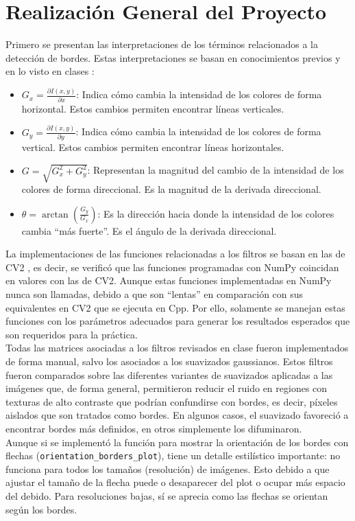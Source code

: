 \section{Realización General del Proyecto}
    Primero se presentan las interpretaciones de los términos relacionados 
    a la detección de bordes. Estas interpretaciones se basan en conocimientos 
    previos y en lo visto en clases \parencite{tinoco2026pdi}: 
    \begin{itemize}
        \item $G_x = \frac{\partial I(x, y)}{\partial x}$: Indica cómo cambia la intensidad de los colores de forma horizontal. Estos cambios permiten encontrar líneas verticales.
        \item $G_y = \frac{\partial I(x, y)}{\partial y}$: Indica cómo cambia la intensidad de los colores de forma vertical. Estos cambios permiten encontrar líneas horizontales.
        \item $G = \sqrt{G_x^2+G_y^2}$: Representan la magnitud del cambio de la intensidad de los colores de forma direccional. Es la magnitud de la derivada direccional.
        \item $\theta = \arctan(\frac{G_y}{G_x})$: Es la dirección hacia donde la intensidad de los colores cambia ``más fuerte''. Es el ángulo de la derivada direccional.
    \end{itemize}

    La implementaciones de las funciones relacionadas a los filtros se basan en 
    las de CV2 \parencite{opencv_library}, es decir, se verificó que las funciones 
    programadas con NumPy \parencite{numpy_library} coincidan en valores con 
    las de CV2. Aunque estas funciones implementadas en NumPy nunca son llamadas, 
    debido a que son ``lentas'' en comparación con sus equivalentes en CV2 que se 
    ejecuta en Cpp. Por ello, solamente se manejan estas funciones con los parámetros 
    adecuados para generar los resultados esperados que son requeridos para la 
    práctica.\\ 

    Todas las matrices asociadas a los filtros revisados en clase fueron implementados 
    de forma manual, salvo los asociados a los suavizados gaussianos. Estos filtros 
    fueron comparados sobre las diferentes variantes de suavizados aplicadas a las 
    imágenes que, de forma general, permitieron reducir el ruido en regiones con 
    texturas de alto contraste que podrían confundirse con bordes, es decir, píxeles 
    aislados que son tratados como bordes. En algunos casos, el suavizado favoreció 
    a encontrar bordes más definidos, en otros simplemente los difuminaron.\\

    Aunque si se implementó la función para mostrar la orientación de los bordes con 
    flechas (\verb|orientation_borders_plot|), tiene un detalle estilístico importante: 
    no funciona para todos los tamaños (resolución) de imágenes. Esto debido a que ajustar 
    el tamaño de la flecha puede o desaparecer del plot o ocupar más espacio del debido. 
    Para resoluciones bajas, sí se aprecia como las flechas se orientan según los bordes. 